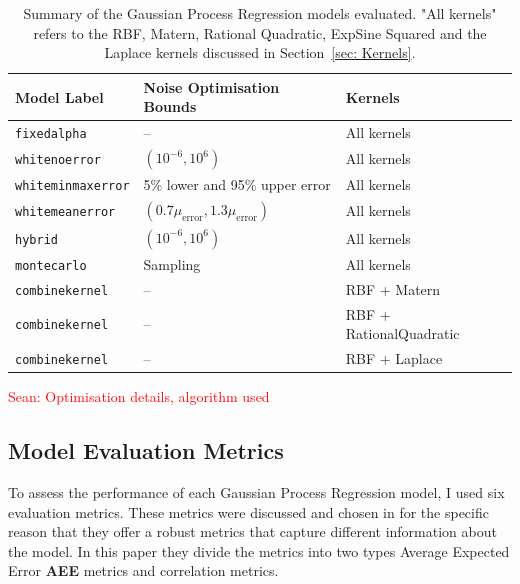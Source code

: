 \documentclass[11pt]{article}
\newcommand{\Sean}[1]{{\textcolor{red}{{Sean: #1}} }}
\begin{document}
\begin{table}[h!]
    \renewcommand{\arraystretch}{1.3}
    \centering
    \begin{tabular}{|l|l|l|}
    \hline
    \textbf{Model Label} & \textbf{Noise Optimisation Bounds} & \textbf{Kernels} \\
    \hline
    \texttt{fixedalpha} & -- & All kernels \\
    \hline
    \texttt{whitenoerror} & \((10^{-6}, 10^6)\) & All kernels \\
    \texttt{whiteminmaxerror} & 5\% lower and 95\% upper error & All kernels \\
    \texttt{whitemeanerror} & \((0.7\mu_{\text{error}}, 1.3\mu_{\text{error}})\) & All kernels \\
    \hline
    \texttt{hybrid} & \((10^{-6}, 10^6)\) & All kernels \\
    \hline
    \texttt{montecarlo} & Sampling & All kernels \\
    \hline
    \texttt{combinekernel} & -- & RBF + Matern \\
    \texttt{combinekernel} & -- & RBF + RationalQuadratic \\
    \texttt{combinekernel} & -- & RBF + Laplace \\
    \hline
    \end{tabular}
    \caption{Summary of the Gaussian Process Regression models evaluated.
     "All kernels" refers to the RBF, Matern, Rational Quadratic, ExpSine Squared and the Laplace kernels discussed in Section~\ref{sec: Kernels}.}
    \label{tab:model_summary}
\end{table}


\Sean{Optimisation details, algorithm used}

\subsection{Model Evaluation Metrics}
\label{sec:metrics}

To assess the performance of each Gaussian Process Regression model, I used six evaluation metrics. These metrics were discussed and chosen in \cite{metrics} for the specific reason that they offer a robust metrics that capture different information about the model. In this paper they divide the metrics into two types Average Expected Error \textbf{AEE} metrics and correlation metrics. 
\end{document}
